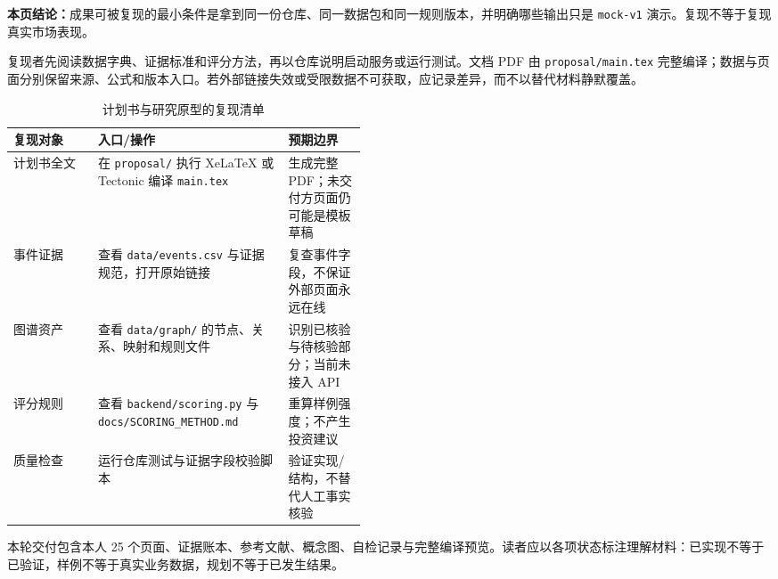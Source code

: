 \textbf{本页结论：}成果可被复现的最小条件是拿到同一份仓库、同一数据包和同一规则版本，并明确哪些输出只是 \texttt{mock-v1} 演示。复现不等于复现真实市场表现。

复现者先阅读数据字典、证据标准和评分方法，再以仓库说明启动服务或运行测试。文档 PDF 由 \texttt{proposal/main.tex} 完整编译；数据与页面分别保留来源、公式和版本入口。若外部链接失效或受限数据不可获取，应记录差异，而不以替代材料静默覆盖。

\begin{table}[htbp]
\centering
\caption{计划书与研究原型的复现清单}
\label{tab:wty-reproducibility}
\small
\begin{tabularx}{\linewidth}{p{0.24\linewidth}X p{0.22\linewidth}}
\toprule
复现对象 & 入口/操作 & 预期边界 \\
\midrule
计划书全文 & 在 \texttt{proposal/} 执行 XeLaTeX 或 Tectonic 编译 \texttt{main.tex} & 生成完整 PDF；未交付方页面仍可能是模板草稿 \\
事件证据 & 查看 \texttt{data/events.csv} 与证据规范，打开原始链接 & 复查事件字段，不保证外部页面永远在线 \\
图谱资产 & 查看 \texttt{data/graph/} 的节点、关系、映射和规则文件 & 识别已核验与待核验部分；当前未接入 API \\
评分规则 & 查看 \texttt{backend/scoring.py} 与 \texttt{docs/SCORING\_METHOD.md} & 重算样例强度；不产生投资建议 \\
质量检查 & 运行仓库测试与证据字段校验脚本 & 验证实现/结构，不替代人工事实核验 \\
\bottomrule
\end{tabularx}
\end{table}

本轮交付包含本人 25 个页面、证据账本、参考文献、概念图、自检记录与完整编译预览。读者应以各项状态标注理解材料：已实现不等于已验证，样例不等于真实业务数据，规划不等于已发生结果。
